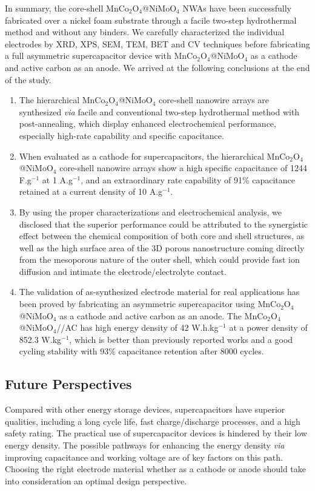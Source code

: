 \documentclass[reprint,amsmath,amssymb,aps,floatfix,
]{revtex4-2}
\begin{document}
In summary, the core-shell MnCo$_2$O$_4$@NiMoO$_4$ NWAs have been successfully fabricated over a nickel foam substrate through a facile two-step hydrothermal method and without any binders. We carefully characterized the individual electrodes by XRD, XPS, SEM, TEM, BET and CV techniques before fabricating a full asymmetric supercapacitor device with MnCo$_2$O$_4$@NiMoO$_4$ as a cathode and active carbon as an anode. We arrived at the following conclusions at the end of the study.
\begin{enumerate}
    \item The hierarchical MnCo$_2$O$_4$@NiMoO$_4$ core-shell nanowire arrays are synthesized {\it via} facile and conventional two-step hydrothermal method with post-annealing, which display enhanced electrochemical performance, especially high-rate capability and specific capacitance.
    \item When evaluated as a cathode for supercapacitors, the hierarchical MnCo$_2$O$_4$@NiMoO$_4$ core-shell nanowire arrays show a high specific capacitance of 1244 F.g$^{-1}$ at 1 A.g$^{-1}$, and an extraordinary rate capability of 91\% capacitance retained at a current density of 10 A.g$^{-1}$.
    \item By using the proper characterizations and electrochemical analysis, we disclosed that the superior performance could be attributed to the synergistic effect between the chemical composition of both core and shell structures, as well as the high surface area of the 3D porous nanostructure coming directly from the mesoporous nature of the outer shell, which could provide fast ion diffusion and intimate the electrode/electrolyte contact.
    \item The validation of as-synthesized electrode material for real applications has been proved by fabricating an asymmetric supercapacitor using MnCo$_2$O$_4$@NiMoO$_4$ as a cathode and active carbon as an anode. The MnCo$_2$O$_4$@NiMoO$_4$//AC has high energy density of 42 W.h.kg$^{-1}$ at a power density of 852.3 W.kg$^{-1}$, which is better than previously reported works and a good cycling stability with 93\% capacitance retention after 8000 cycles.
\end{enumerate}
\subsection{\label{sec:level3}Future Perspectives}
Compared with other energy storage devices, supercapacitors have superior qualities, including a long cycle life, fast charge/discharge processes, and a high safety rating. The practical use of supercapacitor devices is hindered by their low energy density. The possible pathways for enhancing the energy density {\it via} improving capacitance and working voltage are of key factors on this path. Choosing the right electrode material whether as a cathode or anode should take into consideration an optimal design perspective.
\end{document}
